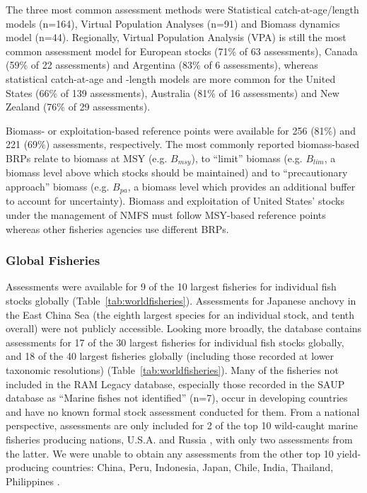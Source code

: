 The three most common assessment methods were
Statistical catch-at-age/length models (n=164), Virtual Population Analyses (n=91) and
Biomass dynamics model (n=44). Regionally, Virtual Population Analysis
(VPA) is still the most common assessment model for European stocks
(71\% of 63 assessments),
Canada (59\% of 22
assessments) and Argentina (83\% of
6 assessments), whereas statistical catch-at-age
and -length models are more common for the United States
(66\% of 139 assessments),
Australia (81\% of 16
assessments) and New Zealand (76\% of
29 assessments).

Biomass- or exploitation-based reference points were available for
256 (81\%) and
221 (69\%)
assessments, respectively. The most commonly reported biomass-based
BRPs relate to biomass at MSY (e.g. $B_{msy}$), to ``limit'' biomass
(e.g. $B_{lim}$, a biomass level above which stocks should be
maintained) and to ``precautionary approach'' biomass (e.g.  $B_{pa}$,
a biomass level which provides an additional buffer to account for
uncertainty). Biomass and exploitation of United States' stocks under
the management of NMFS must follow MSY-based reference points whereas
other fisheries agencies use different BRPs.

\subsubsection*{Global Fisheries}
Assessments were available for 9 of the 10 largest fisheries for
individual fish stocks globally (Table~\ref{tab:worldfisheries}).
Assessments for Japanese anchovy in the East China Sea (the eighth largest species
for an individual stock, and tenth overall) were not publicly
accessible. Looking more broadly, the database contains assessments
for 17 of the 30 largest fisheries for individual fish stocks
globally, and 18 of the 40 largest fisheries globally (including those
recorded at lower taxonomic resolutions)
(Table~\ref{tab:worldfisheries}). Many of the fisheries not included
in the RAM Legacy database, especially those recorded in the SAUP
database as ``Marine fishes not identified'' (n=7), occur in
developing countries and have no known formal stock assessment
conducted for them.  From a national perspective, assessments are only
included for 2 of the top 10 wild-caught marine fisheries producing
nations, U.S.A. and Russia \citep{FAO:sofia}, with only two
assessments from the latter. We were unable to obtain any assessments
from the other top 10 yield-producing countries: China, Peru,
Indonesia, Japan, Chile, India, Thailand, Philippines
\citep{FAO:sofia}. 



